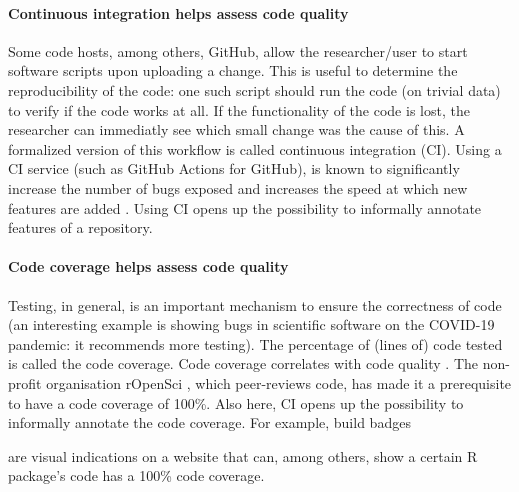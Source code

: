 \paragraph{Continuous integration helps assess code quality}

Some code hosts, among others, GitHub, 
allow the researcher/user to start software scripts upon uploading a change.
This is useful to determine the reproducibility of the code: 
one such script should run the code (on trivial data) 
to verify if the code works at all.
If the functionality of the code is lost, the researcher
can immediatly see which small change was the cause of this.
A formalized version of this workflow is called continuous integration (CI).
Using a CI service (such as GitHub Actions for GitHub), 
is known to significantly 
increase the number of bugs exposed \cite{vasilescu2015} and increases
the speed at which new features are added \cite{vasilescu2015}.
Using CI opens up the possibility to informally annotate features of
a repository. 

\paragraph{Code coverage helps assess code quality}

Testing, in general, is an important mechanism to ensure
the correctness of code (an interesting example is \cite{rahman2020exploratory}
showing bugs in scientific software on the COVID-19 pandemic:
it recommends more testing).
The percentage of (lines of) code tested is called the code coverage.
Code coverage correlates with code quality \cite{horgan1994,del1995correlation}. 
The non-profit organisation rOpenSci \cite{ram2018community},
which peer-reviews code,
has made it a prerequisite to have a code coverage of 100\%.
Also here, CI opens up the possibility to informally annotate the
code coverage. 
For example, build badges

are visual indications on a website that can, among others,
show a certain R package's code has a 100\% code coverage.


